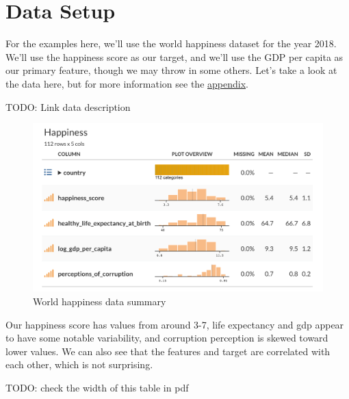 \documentclass[
  letterpaper,
]{krantz}
\begin{document}
\section{Data Setup}\label{sec-estim-data-setup}

For the examples here, we'll use the world happiness dataset for the
year 2018. We'll use the happiness score as our target, and we'll use
the GDP per capita as our primary feature, though we may throw in some
others. Let's take a look at the data here, but for more information see
the \hyperref[appendix]{appendix}.

TODO: Link data description

\begin{figure}[H]

{\centering \includegraphics[width=1\textwidth,height=\textheight]{img/happiness_data_summary.png}

}

\caption{World happiness data summary}

\end{figure}%

Our happiness score has values from around 3-7, life expectancy and gdp
appear to have some notable variability, and corruption perception is
skewed toward lower values. We can also see that the features and target
are correlated with each other, which is not surprising.

TODO: check the width of this table in pdf

\small
\end{document}
